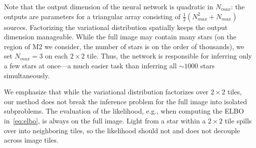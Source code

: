 
Note that the output dimension of the neural network is quadratic in $N_{max}$: the outputs are parameters for a triangular array consisting of $\frac{1}{2}(N_{max}^2 + N_{max})$ sources. 
Factorizing the variational distribution spatially keeps the output dimension manageable.
While the full image may contain many stars (on the region of M2 we consider, the number of stars is on the order of thousands), 
we set $N_{max} = 3$ on each $2\times 2$ tile. 
Thus, the network is responsible for inferring only a few stars at once---a much easier task than inferring all $\sim1000$ stars simultaneously. 

We emphasize that while the variational distribution factorizes over $2 \times 2$ tiles, our method does not break the inference problem for the full image into isolated subproblems. The evaluation of the likelihood, e.g., when computing the ELBO in~\eqref{eq:elbo}, is always on the full image. Light from a star within a $2 \times 2$ tile spills over into neighboring tiles, so the likelihood should not and does not decouple across image tiles. 
